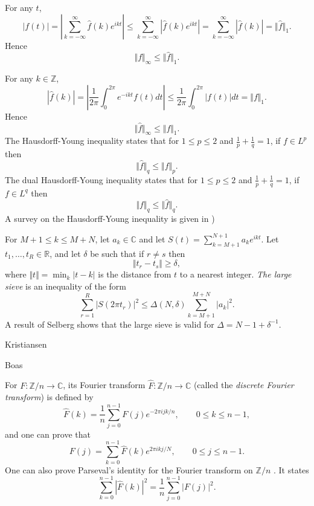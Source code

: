 \documentclass{article}
\newcommand{\norm}[1]{\Vert #1 \Vert}
\theoremstyle{definition}
\begin{document}
For any $t$,
\[
|f(t)|=\left| \sum_{k=-\infty}^\infty \hat{f}(k)e^{ikt} \right| \leq \sum_{k=-\infty}^\infty |\hat{f}(k)e^{ikt}|=\sum_{k=-\infty}^\infty |\hat{f}(k)|=\norm{\hat{f}}_1.
\]
Hence
\[
\norm{f}_\infty \leq \norm{\hat{f}}_1.
\]








For any $k \in \mathbb{Z}$,
\[
|\hat{f}(k)| = \left| \frac{1}{2\pi} \int_0^{2\pi} e^{-ikt} f(t) dt \right|
\leq \frac{1}{2\pi} \int_0^{2\pi} |f(t)| dt = \norm{f}_1.
\]
Hence
\[
\norm{\hat{f}}_\infty \leq \norm{f}_1.
\]
The Hausdorff-Young inequality \cite[p.~57, Corollary~2.4]{steinIV} states that for $1 \leq p \leq 2$ and $\frac{1}{p}+\frac{1}{q}=1$, if $f \in L^p$ then
\[
\norm{\hat{f}}_q \leq \norm{f}_p.
\]
The dual Hausdorff-Young inequality \cite[p.~58, Corollary~2.5]{steinIV} states that for $1 \leq p \leq 2$ and $\frac{1}{p}+\frac{1}{q}=1$, if $f \in L^q$ then
\[
\norm{f}_q \leq \norm{\hat{f}}_q.
\]
A survey on the Hausdorff-Young inequality is given in \cite{MR1348739}) 





For $M+1 \leq k \leq M+N$, let $a_k \in \mathbb{C}$ and let
$S(t)=\sum_{k=M+1}^{N+1} a_k e^{ikt}$. Let $t_1,\ldots,t_R \in \mathbb{R}$, and let $\delta$ be such that
if $r \neq s$ then
\[
\norm{t_r-t_s} \geq \delta,
\]
where $\norm{t}=\min_k | t-k|$ is the distance from $t$ to a nearest integer. 
{\em The large sieve} \cite{sieve} is an inequality of the form
\[
\sum_{r=1}^R |S(2\pi t_r)|^2 \leq \Delta(N,\delta) \sum_{k=M+1}^{M+N} |a_k|^2.
\]
A result of Selberg \cite[p.~559, Theorem~3]{sieve} shows that the large sieve is valid for $\Delta=N-1+\delta^{-1}$.

Kristiansen \cite{MR0340916} 

Boas \cite{MR0023366}






For $F:\mathbb{Z}/n \to \mathbb{C}$, its Fourier transform $\hat{F}:\mathbb{Z}/n \to \mathbb{C}$ (called the 
{\em discrete Fourier transform}) is defined by
\[
\hat{F}(k)=\frac{1}{n} \sum_{j=0}^{n-1} F(j) e^{-2\pi ijk/n}, \qquad 0 \leq k \leq n-1,
\]
and one can prove \cite[p.~223, Theorem~1.2]{steinI} that 
\[
F(j)=\sum_{k=0}^{n-1} \hat{F}(k) e^{2\pi ikj/N}, \qquad 0 \leq j \leq n-1.
\]
One can also prove Parseval's identity for the Fourier transform on $\mathbb{Z}/n$ \cite[p.~223, Theorem ~1.2]{steinI}. It states 
\[
\sum_{k=0}^{n-1} |\hat{F}(k)|^2=\frac{1}{n}\sum_{j=0}^{n-1} |F(j)|^2.
\]
\end{document}
